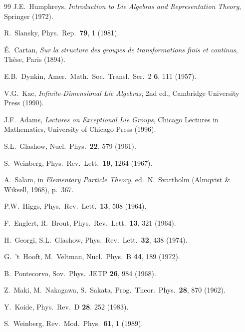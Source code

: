 \documentclass[12pt,a4paper]{article}
\begin{document}
\begin{thebibliography}{99}
 J.E.~Humphreys, \textit{Introduction to Lie Algebras and Representation Theory}, Springer (1972).

 R.~Slansky, Phys.\ Rep.\ \textbf{79}, 1 (1981).

 \'E.~Cartan, \textit{Sur la structure des groupes de transformations finis et continus}, Th\`ese, Paris (1894).

 E.B.~Dynkin, Amer.\ Math.\ Soc.\ Transl.\ Ser.~2 \textbf{6}, 111 (1957).

 V.G.~Kac, \textit{Infinite-Dimensional Lie Algebras}, 2nd ed., Cambridge University Press (1990).

 J.F.~Adams, \textit{Lectures on Exceptional Lie Groups}, Chicago Lectures in Mathematics, University of Chicago Press (1996).


 S.L.~Glashow, Nucl.\ Phys.\ \textbf{22}, 579 (1961).

 S.~Weinberg, Phys.\ Rev.\ Lett.\ \textbf{19}, 1264 (1967).

 A.~Salam, in \textit{Elementary Particle Theory}, ed.\ N.~Svartholm (Almqvist \& Wiksell, 1968), p.~367.

 P.W.~Higgs, Phys.\ Rev.\ Lett.\ \textbf{13}, 508 (1964).

 F.~Englert, R.~Brout, Phys.\ Rev.\ Lett.\ \textbf{13}, 321 (1964).

 H.~Georgi, S.L.~Glashow, Phys.\ Rev.\ Lett.\ \textbf{32}, 438 (1974).

 G.~'t~Hooft, M.~Veltman, Nucl.\ Phys.\ B \textbf{44}, 189 (1972).


 B.~Pontecorvo, Sov.\ Phys.\ JETP \textbf{26}, 984 (1968).

 Z.~Maki, M.~Nakagawa, S.~Sakata, Prog.\ Theor.\ Phys.\ \textbf{28}, 870 (1962).


 Y.~Koide, Phys.\ Rev.\ D \textbf{28}, 252 (1983).


 S.~Weinberg, Rev.\ Mod.\ Phys.\ \textbf{61}, 1 (1989).


\end{thebibliography}
\end{document}

